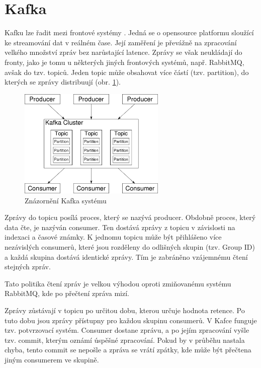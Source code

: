 \documentclass[thesis=M,czech,hidelinks]{FITthesis}[2013/05/06]
\begin{document}
\section{Kafka}\label{sec:kafka}
Kafku lze řadit mezi frontové systémy \cite{kafka...}. Jedná se o opensource platformu sloužící ke streamování dat v reálném čase. Její zaměření je převážně na zpracování velkého množství zpráv bez narůstající latence. Zprávy se však neukládají do fronty, jako je tomu u některých jiných frontových systémů, např. RabbitMQ, avšak do tzv. topiců. Jeden topic může obsahovat více částí (tzv. partition), do kterých se zprávy distribuují (obr. \ref{fig:kafka}). 
\begin{figure}[h]
	\centering
	\includegraphics[width=7cm]{pictures/kafka.png}
	\caption{Znázornění Kafka systému \cite{kafka}}
	\label{fig:kafka}
\end{figure}
Zprávy do topicu posílá proces, který se nazývá producer. Obdobně proces, který data čte, je nazýván consumer. Ten dostává zprávy z topicu v závislosti na indexaci a časové známky. K jednomu topicu může být přihlášeno více nezávislých consumerů, které jsou rozděleny do odlišných skupin (tzv. Group ID) a každá skupina dostává identické zprávy. Tím je zabráněno vzájemnému čtení stejných zpráv.

Tato politika čtení zpráv je velkou výhodou oproti zmiňovanému systému RabbitMQ, kde po přečtení zpráva mizí. 

Zprávy zůstávají v topicu po určitou dobu, kterou určuje hodnota retence. Po tuto dobu jsou zprávy přístupny pro každou skupinu consumerů. V Kafce funguje tzv. potvrzovací systém. Consumer dostane zprávu, a po jejím zpracování vyšle tzv. commit, kterým oznámí úspěšné zpracování. Pokud by v průběhu nastala chyba, tento commit se nepošle a zpráva se vrátí zpátky, kde může být přečtena jiným consumerem ve skupině.
\end{document}
